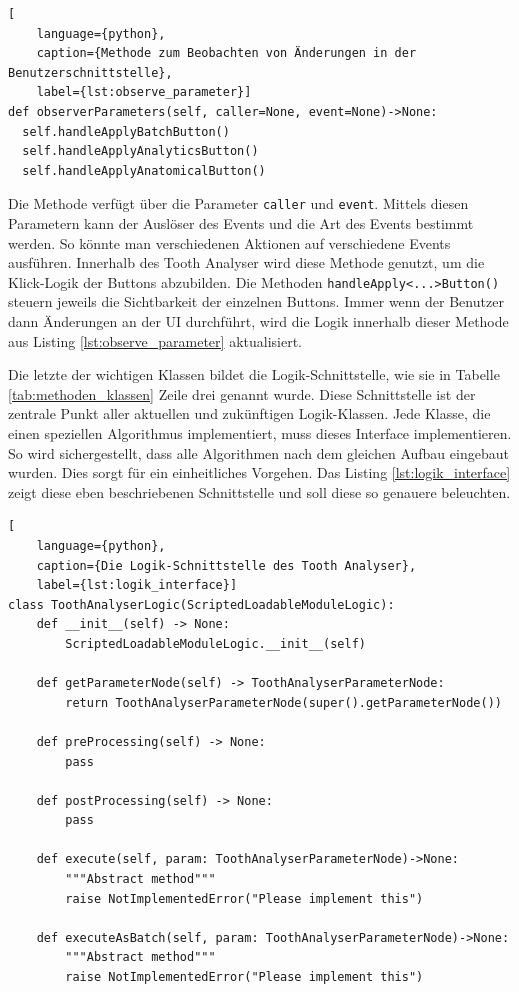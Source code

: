 \begin{lstlisting}[
    language={python},
    caption={Methode zum Beobachten von Änderungen in der Benutzerschnittstelle},
    label={lst:observe_parameter}]
def observerParameters(self, caller=None, event=None)->None:
  self.handleApplyBatchButton()
  self.handleApplyAnalyticsButton()
  self.handleApplyAnatomicalButton()
\end{lstlisting}

Die Methode verfügt über die Parameter \texttt{caller} und \texttt{event}. Mittels
diesen Parametern kann der Auslöser des Events und die Art des Events bestimmt werden.
So könnte man verschiedenen Aktionen auf verschiedene Events ausführen. Innerhalb
des Tooth Analyser wird diese Methode genutzt, um die Klick-Logik der Buttons
abzubilden. Die Methoden \texttt{handleApply<...>Button()} steuern jeweils die
Sichtbarkeit der einzelnen Buttons. Immer wenn der Benutzer dann Änderungen an der
UI durchführt, wird die Logik innerhalb dieser Methode aus Listing
\ref{lst:observe_parameter} aktualisiert.

Die letzte der wichtigen Klassen bildet die Logik-Schnittstelle, wie sie in Tabelle
\ref{tab:methoden_klassen} Zeile drei genannt wurde. Diese Schnittstelle ist der
zentrale Punkt aller aktuellen und zukünftigen Logik-Klassen. Jede Klasse, die
einen speziellen Algorithmus implementiert, muss dieses Interface implementieren.
So wird sichergestellt, dass alle Algorithmen nach dem gleichen Aufbau eingebaut
wurden. Dies sorgt für ein einheitliches Vorgehen. Das Listing \ref{lst:logik_interface}
zeigt diese eben beschriebenen Schnittstelle und soll diese so genauere beleuchten.

\pagebreak

\begin{lstlisting}[
    language={python},
    caption={Die Logik-Schnittstelle des Tooth Analyser},
    label={lst:logik_interface}]
class ToothAnalyserLogic(ScriptedLoadableModuleLogic):
    def __init__(self) -> None:
        ScriptedLoadableModuleLogic.__init__(self)

    def getParameterNode(self) -> ToothAnalyserParameterNode:
        return ToothAnalyserParameterNode(super().getParameterNode())

    def preProcessing(self) -> None:
        pass

    def postProcessing(self) -> None:
        pass

    def execute(self, param: ToothAnalyserParameterNode)->None:
        """Abstract method"""
        raise NotImplementedError("Please implement this")

    def executeAsBatch(self, param: ToothAnalyserParameterNode)->None:
        """Abstract method"""
        raise NotImplementedError("Please implement this")
\end{lstlisting}

